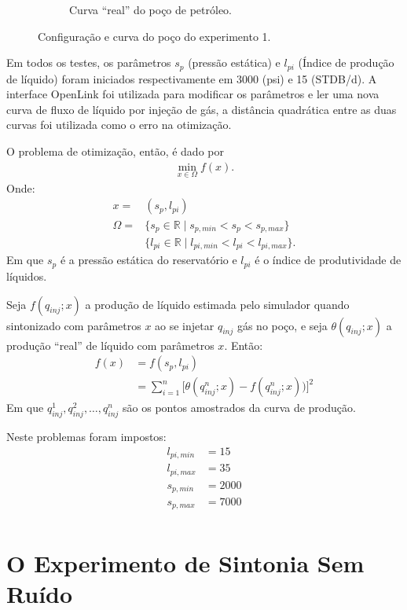 \begin{figure}[H]
\begin{subfigure}{.75\textwidth}
  \caption{Curva ``real'' do poço de petróleo.}
  \label{fig:truth1}
\end{subfigure}
\caption{Configuração e curva do poço do experimento 1.}
\label{fig:setup1}
\end{figure}

Em todos os testes, os parâmetros $s_p$ (pressão estática) e $l_{pi}$ (Índice de produção de líquido) foram iniciados respectivamente em 3000 (psi) e 15 (STDB/d). A interface OpenLink foi utilizada para modificar os parâmetros e ler uma nova curva de fluxo de líquido por injeção de gás, a distância quadrática entre as duas curvas foi utilizada como o erro na otimização.

O problema de otimização, então, é dado por 
\begin{align}
\min\limits_{x \in \Omega} f(x)\text{.}
\end{align}
Onde:
\begin{align}
x = &(s_p, l_{pi})\\
\Omega = &\{s_p \in \mathbb{R} \mid s_{p,min} < s_p < s_{p,max}\}\\
          &\{l_{pi} \in \mathbb{R} \mid  l_{pi,min} < l_{pi} < l_{pi,max}\}\text{.}
\end{align}
Em que $s_p$ é a pressão estática do reservatório e $l_{pi}$ é o índice de produtividade de líquidos. 

Seja $f(q_{inj};x)$ a produção de líquido estimada pelo simulador quando sintonizado com parâmetros $x$ ao se injetar $q_{inj}$ gás no poço, e seja $\theta(q_{inj};x)$ a produção ``real'' de líquido com parâmetros $x$. Então:
\begin{align}
f(x) &= f(s_p, l_{pi}) \\
     &= \sum_{i=1}^n \Big[ \theta(q_{inj}^n;x) - f(q_{inj}^n;x))\Big]^2
\end{align}
Em que $q_{inj}^1, q_{inj}^2, \dots, q_{inj}^n$ são os pontos amostrados da curva de produção. 

Neste problemas foram impostos: 
\begin{align*}
l_{pi,min}&= 15\\
l_{pi,max}&= 35\\
s_{p,min} &= 2000\\
s_{p,max} &= 7000\\
\end{align*}
\chapter{O Experimento de Sintonia Sem Ruído}

